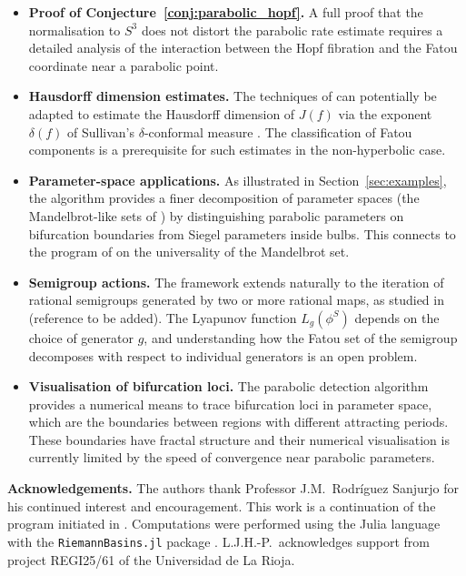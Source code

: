 \documentclass[12pt]{article}
\theoremstyle{definition}
\begin{document}
\begin{itemize}
  \item \textbf{Proof of Conjecture~\ref{conj:parabolic_hopf}.}  A
        full proof that the normalisation to $S^3$ does not distort the
        parabolic rate estimate requires a detailed analysis of the
        interaction between the Hopf fibration and the Fatou coordinate
        near a parabolic point.

  \item \textbf{Hausdorff dimension estimates.}  The techniques of
        \cite{Alvarez2023} can potentially be adapted to estimate the
        Hausdorff dimension of $J(f)$ via the exponent $\delta(f)$ of
        Sullivan's $\delta$-conformal measure \cite{Sullivan1983,
        Gelfert2010}.  The classification of Fatou components is a
        prerequisite for such estimates in the non-hyperbolic case.

  \item \textbf{Parameter-space applications.}  As illustrated in
        Section~\ref{sec:examples}, the algorithm provides a finer
        decomposition of parameter spaces (the Mandelbrot-like sets of
        \cite{Alvarez2023}) by distinguishing parabolic parameters on
        bifurcation boundaries from Siegel parameters inside bulbs.
        This connects to the program of \cite{McMullen1987} on the
        universality of the Mandelbrot set.

  \item \textbf{Semigroup actions.}  The framework extends naturally to
        the iteration of rational semigroups generated by two or more
        rational maps, as studied in \cite{HinkkaneMartin} (reference
        to be added).  The Lyapunov function $L_g(\phi^S)$ depends on
        the choice of generator $g$, and understanding how the Fatou
        set of the semigroup decomposes with respect to individual
        generators is an open problem.

  \item \textbf{Visualisation of bifurcation loci.}  The parabolic
        detection algorithm provides a numerical means to trace
        bifurcation loci in parameter space, which are the boundaries
        between regions with different attracting periods.  These
        boundaries have fractal structure and their numerical
        visualisation is currently limited by the speed of convergence
        near parabolic parameters.
\end{itemize}

\bigskip
\noindent\textbf{Acknowledgements.}
The authors thank Professor J.M.~Rodríguez Sanjurjo for his continued
interest and encouragement.  This work is a continuation of the program
initiated in \cite{Extremiana2019,Alvarez2023}.  Computations were
performed using the Julia language \cite{Julia2017} with the
\texttt{RiemannBasins.jl} package \cite{RiemannBasins}.
L.J.H.-P.\ acknowledges support from project REGI25/61 of the
Universidad de La Rioja.



\end{document}
